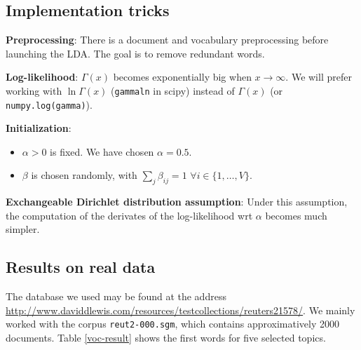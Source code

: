 \documentclass{article}
\begin{document}
\subsection{Implementation tricks}


\textbf{Preprocessing}: There is a document and vocabulary preprocessing before launching the LDA. The goal is to remove redundant words.

\textbf{Log-likelihood}: $\Gamma(x)$ becomes exponentially big when $x \rightarrow \infty$. We will prefer working with $\ln \Gamma(x)$ (\texttt{gammaln} in scipy) instead of $\Gamma(x)$ (or \texttt{numpy.log(gamma)}).

\textbf{Initialization}:
\begin{itemize}
\setlength\itemsep{-0.2em}
  \item $\alpha> 0$ is fixed. We have chosen $\alpha = 0.5$.
  \item $\beta$ is chosen randomly, with $\sum_{j} \beta_{ij} = 1$ $\forall i \in \{1, \ldots, V\}$.
\end{itemize}

\textbf{Exchangeable Dirichlet distribution assumption}: Under this assumption, the computation of the derivates of the log-likelihood wrt $\alpha$ becomes much simpler.

\subsection{Results on real data}

The database we used may be found at the address \url{http://www.daviddlewis.com/resources/testcollections/reuters21578/}. We mainly worked with the corpus \texttt{reut2-000.sgm}, which contains approximatively 2000 documents. Table \ref{voc-result} shows the first words for five selected topics.
\end{document}
